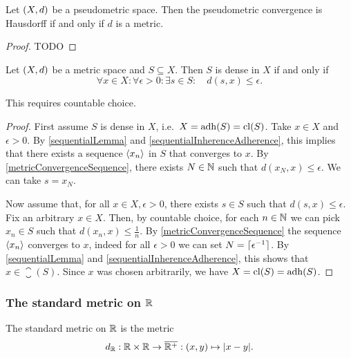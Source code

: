 \begin{proposition} \label{metricConvergenceHausdorff}
Let $\sSet{X,d}$ be a pseudometric space. Then the pseudometric convergence is Hausdorff \textup{if and only if} $d$ is a metric.
\end{proposition}
\begin{proof}
TODO
\end{proof}

\begin{lemma} \label{metricDensityLemma}
Let $\sSet{X,d}$ be a metric space and $S\subseteq X$. Then $S$ is dense in $X$ \textup{if and only if}
\[ \forall x\in X: \forall \epsilon >0: \exists s\in S: \quad d(s,x) \leq \epsilon. \]
\end{lemma}
This requires countable choice.
\begin{proof}
First assume $S$ is dense in $X$, i.e.\ $X = \operatorname{adh}(S) = \operatorname{cl}(S)$. Take $x\in X$ and $\epsilon >0$. By \ref{sequentialLemma} and \ref{sequentialInherenceAdherence}, this implies that there exists a sequence $\left\langle x_n \right\rangle$ in $S$ that converges to $x$. By \ref{metricConvergenceSequence}, there exists $N\in \mathbb{N}$ such that $d(x_N, x)\leq \epsilon$. We can take $s = x_N$.

Now assume that, for all $x\in X, \epsilon >0$, there exists $s\in S$ such that $d(s,x)\leq \epsilon$. Fix an arbitrary $x\in X$. Then, by countable choice, for each $n\in \mathbb{N}$ we can pick $x_n\in S$ such that $d(x_n, x)\leq \frac{1}{n}$. By \ref{metricConvergenceSequence} the sequence $\left\langle x_n \right\rangle$ converges to $x$, indeed for all $\epsilon >0$ we can set $N = \lceil\epsilon^{-1}\rceil$. By \ref{sequentialLemma} and \ref{sequentialInherenceAdherence}, this shows that $x\in \closure(S)$. Since $x$ was chosen arbitrarily, we have $X = \operatorname{cl}(S) = \operatorname{adh}(S)$.
\end{proof}


\subsubsection{The standard metric on $\mathbb{R}$}
\begin{definition}
The standard metric on $\mathbb{R}$ is the metric
\[ d_{\mathbb{R}}: \mathbb{R}\times \mathbb{R}\to\overline{\mathbb{R}^+}: (x,y) \mapsto |x-y|. \]
\end{definition}

